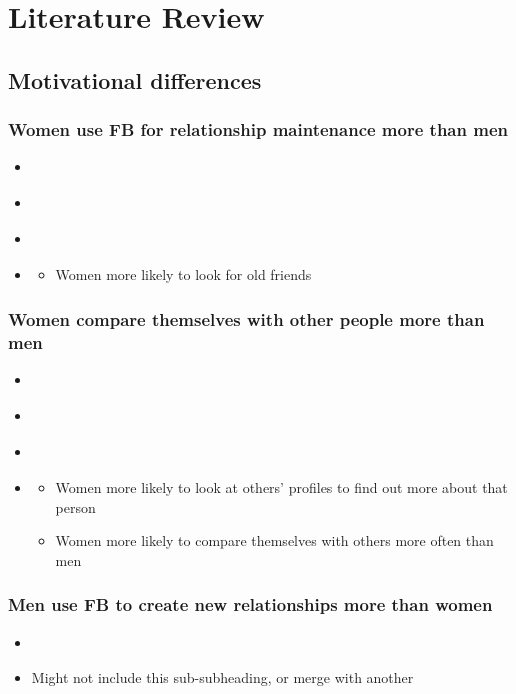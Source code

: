 \section{Literature Review}

\subsection{Motivational differences}

\subsubsection{Women use FB for relationship maintenance more than men}
\begin{itemize}
\item \citet{Kimbrough2013}
\item \citet{Muscanell2012}
\item \citet{Raacke2008}
\item \citet{Mazman2011}
	\begin{itemize}
	\item Women more likely to look for old friends
	\end{itemize}
\end{itemize}
	
\subsubsection{Women compare themselves with other people more than men}
\begin{itemize}
\item \citet{McAndrew2012}
\item \citet{Choi2014}
\item \citet{Fogel2009}
\item \citet{Haferkamp2012}
	\begin{itemize}
	\item Women more likely to look at others' profiles to find out more about that person
	\item Women more likely to compare themselves with others more often than men
	\end{itemize}
\end{itemize}
	
\subsubsection{Men use FB to create new relationships more than women}
\begin{itemize}
\item \citet{Mazman2011}
\item Might not include this sub-subheading, or merge with another
\end{itemize}

